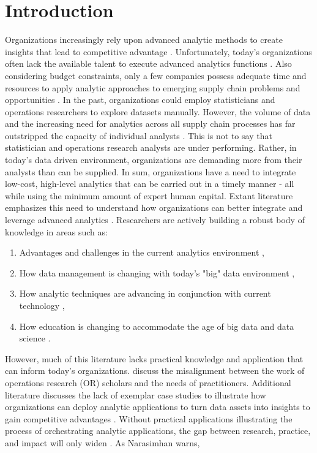 \documentclass[twocolumn]{svjour3}       %
\begin{document}
\section{Introduction}
\label{intro}

Organizations increasingly rely upon advanced analytic methods to create insights that lead to competitive advantage \citep{wf13-2,ll13}. Unfortunately, today's organizations often lack the available talent to execute advanced analytics functions \citep{dp12}. Also considering budget constraints, only a few companies possess adequate time and resources to apply analytic approaches to emerging supply chain problems and opportunities \citep{bj16}. In the past, organizations could employ statisticians and operations researchers to explore datasets manually. However, the volume of data and the increasing need for analytics across all supply chain processes has far outstripped the capacity of individual analysts \citep{pf13}. This is not to say that statistician and operations research analysts are under performing.  Rather, in today's data driven environment, organizations are demanding more from their analysts than can be supplied.  In sum, organizations have a need to integrate low-cost, high-level analytics that can be carried out in a timely manner - all while using the minimum amount of expert human capital.
Extant literature emphasizes this need to understand how organizations can better integrate and leverage advanced analytics \citep{ss15}. Researchers are actively building a robust body of knowledge in areas such as:
\begin{enumerate}
  \item Advantages and challenges in the current analytics environment \citep{mb12,ots12,wgnp16},
  \item How data management is changing with today's "big" data environment \citep{cz14,wssa15,rmha16},
  \item How analytic techniques are advancing in conjunction with current technology \citep{hsbh16,wf13,wgnp16},
  \item How education is changing to accommodate the age of big data and data science \citep{ss15,dg15,gk14}.
\end{enumerate}
However, much of this literature lacks practical knowledge and application that can inform today's organizations. \citet{hsbh16} discuss the misalignment between the work of operations research (OR) scholars and the needs of practitioners. Additional literature discusses the lack of exemplar case studies to illustrate how organizations can deploy analytic applications to turn data assets into insights to gain competitive advantages \citep{gh14,p14,wgnp16}.  Without practical applications illustrating the process of orchestrating analytic applications, the gap between research, practice, and impact will only widen \citep{rmha16}.  As Narasimhan warns,
\end{document}
